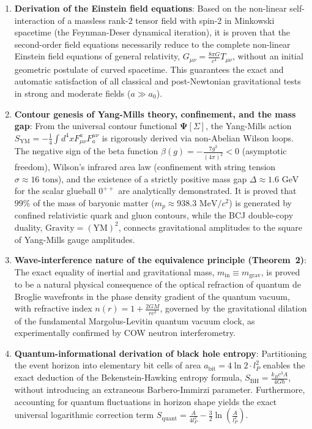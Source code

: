 \documentclass[11pt,a4paper]{article}
\theoremstyle{definition}
\begin{document}
\begin{enumerate}
\item \textbf{Derivation of the Einstein field equations}: Based on the non-linear self-interaction of a massless rank-2 tensor field with spin-2 in Minkowski spacetime (the Feynman-Deser dynamical iteration), it is proven that the second-order field equations necessarily reduce to the complete non-linear Einstein field equations of general relativity, $G_{\mu\nu} = \frac{8\pi G}{c^4} T_{\mu\nu}$, without an initial geometric postulate of curved spacetime. This guarantees the exact and automatic satisfaction of all classical and post-Newtonian gravitational tests in strong and moderate fields ($a \gg a_0$).

\item \textbf{Contour genesis of Yang-Mills theory, confinement, and the mass gap}: From the universal contour functional $\mathbf{\Psi}[\Sigma]$, the Yang-Mills action $S_{\text{YM}} = -\frac{1}{4}\int d^4x F_{\mu\nu}^a F^{\mu\nu}_a$ is rigorously derived via non-Abelian Wilson loops. The negative sign of the beta function $\beta(g) = -\frac{7g^3}{(4\pi)^2} < 0$ (asymptotic freedom), Wilson's infrared area law (confinement with string tension $\sigma \approx 16\text{ tons}$), and the existence of a strictly positive mass gap $\Delta \approx 1.6\text{ GeV}$ for the scalar glueball $0^{++}$ are analytically demonstrated. It is proved that $99\%$ of the mass of baryonic matter ($m_p \approx 938.3\text{ MeV}/c^2$) is generated by confined relativistic quark and gluon contours, while the BCJ double-copy duality, $\text{Gravity} = (\text{YM})^2$, connects gravitational amplitudes to the square of Yang-Mills gauge amplitudes.

\item \textbf{Wave-interference nature of the equivalence principle (Theorem~2)}: The exact equality of inertial and gravitational mass, $m_{\text{in}} \equiv m_{\text{grav}}$, is proved to be a natural physical consequence of the optical refraction of quantum de Broglie wavefronts in the phase density gradient of the quantum vacuum, with refractive index $n(r) = 1 + \frac{2GM}{r c^2}$, governed by the gravitational dilation of the fundamental Margolus-Levitin quantum vacuum clock, as experimentally confirmed by COW neutron interferometry.

\item \textbf{Quantum-informational derivation of black hole entropy}: Partitioning the event horizon into elementary bit cells of area $a_{\text{bit}} = 4\ln 2 \cdot l_P^2$ enables the exact deduction of the Bekenstein-Hawking entropy formula, $S_{\text{BH}} = \frac{k_B c^3 A}{4 G \hbar}$, without introducing an extraneous Barbero-Immirzi parameter. Furthermore, accounting for quantum fluctuations in horizon shape yields the exact universal logarithmic correction term $S_{\text{quant}} = \frac{A}{4 l_P^2} - \frac{3}{2}\ln\left(\frac{A}{l_P^2}\right)$.


\end{enumerate}
\end{document}
